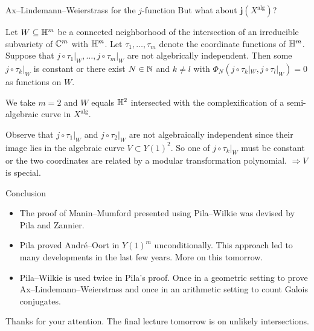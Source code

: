 \documentclass{beamer}
\begin{document}
\begin{frame}{Ax--Lindemann--Weierstrass for the $j$-function}
  But what about $\boldsymbol{j}(X^{\mathrm{alg}})$?

  \begin{theorem}[Pila, 2011]
    Let $W\subseteq{\mathbb{H}}^m$ be a connected neighborhood of the
    intersection of an
    irreducible subvariety of ${\mathbb{C}}^m$ with ${\mathbb{H}}^m$.
    Let $\tau_1,\ldots,\tau_m$ denote the coordinate functions of ${\mathbb{H}}^m$.
    Suppose that $j\circ {\tau_1|}_{W},\ldots,j\circ {\tau_m}|_{W}$
    are \alert{not} algebrically independent.
    Then some $j\circ{\tau_k}|_W$ is constant or
  there exist $N\in{\mathbb{N}}$ and 
    $k\not=l$ with $\Phi_N(j\circ \tau_k|_W,j\circ \tau_l|_W)=0$ as
    functions on $W$.    
  \end{theorem}
  \vspace{-.2cm}
  
  We take $m=2$ and  $W$ equals ${\mathbb{H}}^2$
  intersected with the complexification of a semi-algebraic curve in $X^{\mathrm{alg}}$.
  
  Observe that $j\circ \tau_1|_W$ and $j\circ \tau_2|_W$ are not
  algebraically independent since their image lies in the algebraic curve
  $V\subset Y(1)^2$.
  So one of $j\circ \tau_k|_W$ must be constant or the two coordinates
  are related by a modular transformation polynomial. 
  $\Rightarrow V$ is \alert{special}.  
\end{frame}


\begin{frame}{Conclusion}
  \begin{itemize}
  \item The proof of Manin--Mumford presented using Pila--Wilkie was
    devised by Pila and Zannier.

  \item Pila proved Andr\'e--Oort in $Y(1)^m$ \alert{unconditionally}.
    This approach led to many developments in the last few years. More on
    this tomorrow. 
    
  \item Pila--Wilkie is used \alert{twice} in Pila's proof. Once in a
    \alert{geometric} setting to prove
    Ax--Lindemann--Weierstrass and once in an \alert{arithmetic} setting to count Galois conjugates. 
  \end{itemize}
  
  
\end{frame}

\begin{frame}
  \begin{center}
    Thanks for your attention. The final lecture tomorrow is on unlikely
    intersections. 
  \end{center}
\end{frame}
\end{document}
